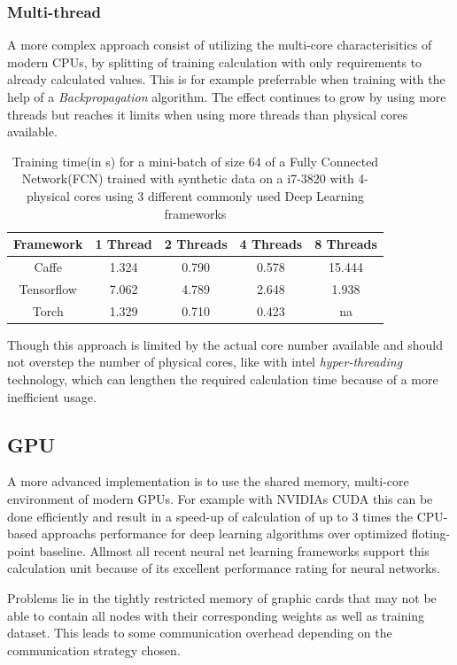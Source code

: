 \documentclass[conference]{IEEEtran}
\begin{document}
\subsubsection{Multi-thread}
A more complex approach consist of utilizing the multi-core characterisitics of modern CPUs, by splitting of training calculation with only requirements to already calculated values. This is for example preferrable when training with the help of a \emph{Backpropagation} algorithm. The effect  continues to grow by using more threads but reaches it limits when using more threads than physical cores available.
\begin{table} 
\centering
\begin{tabular}{c c c c c}
\hline
Framework & 1 Thread & 2 Threads &4 Threads & 8 Threads\\\hline
Caffe & 1.324 & 0.790 & 0.578 & 15.444 \\
Tensorflow & 7.062 & 4.789 & 2.648 & 1.938 \\
Torch & 1.329 & 0.710 & 0.423 & na \\\hline
\end{tabular}
\caption{Training time(in s) for a mini-batch of size 64 of a Fully Connected Network(FCN) trained with synthetic data on a i7-3820 with 4-physical cores using 3 different commonly used Deep Learning frameworks\cite{shi2016benchmarking}}
\label{fig_ttfcn}
\end{table}
Though this approach is limited by the actual core number available and should not overstep the number of physical cores, like with intel \emph{hyper-threading} technology, which can lengthen the required calculation time because of a more inefficient usage\cite{shi2016benchmarking}.
\subsection{GPU}
A more advanced implementation is to use the shared memory, multi-core environment of modern GPUs. For example with NVIDIAs CUDA this can be done efficiently and result in a speed-up of calculation of up to 3 times the CPU-based approachs performance for deep learning algorithms over optimized floting-point baseline\cite{shi2016benchmarking}. Allmost all recent neural net learning frameworks support this calculation unit because of its excellent performance rating for neural networks.

Problems lie in the tightly restricted memory of graphic cards that may not be able to contain all nodes with their corresponding weights as well as training dataset. This leads to some communication overhead depending on the communication strategy chosen.
\end{document}
